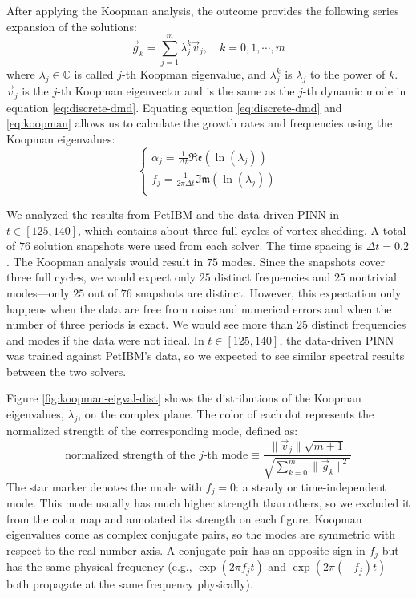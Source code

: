 After applying the Koopman analysis, the outcome provides the following series expansion of the solutions:
\begin{equation}\label{eq:koopman}
    \vec{g}_k
    =
    \sum\limits_{j=1}^{m}
    \lambda_j^k \vec{v}_j
    ,\quad
    k = 0, 1, \cdots, m
\end{equation}
where $\lambda_j \in \mathbb{C}$ is called $j$-th Koopman eigenvalue, and $\lambda_j^k$ is $\lambda_j$ to the power of $k$.
$\vec{v}_j$ is the $j$-th Koopman eigenvector and is the same as the $j$-th dynamic mode in equation \eqref{eq:discrete-dmd}.
Equating equation \eqref{eq:discrete-dmd} and \eqref{eq:koopman} allows us to calculate the growth rates and frequencies using the Koopman eigenvalues:
\begin{equation}
    \left\{
        \begin{array}{l}
            \alpha_j = \frac{1}{\Delta t} \mathfrak{Re}\left(\ln\left(\lambda_j\right)\right) \\
            f_j = \frac{1}{2\pi\Delta t} \mathfrak{Im}\left(\ln\left(\lambda_j\right)\right) \\
        \end{array}
    \right.
\end{equation} 

We analyzed the results from PetIBM and the data-driven PINN in $t\in[125, 140]$, which contains about three full cycles of vortex shedding.
A total of $76$ solution snapshots were used from each solver.
The time spacing is $\Delta t = 0.2$.
The Koopman analysis would result in $75$ modes.
Since the snapshots cover three full cycles, we would expect only $25$ distinct frequencies and $25$ nontrivial modes---only $25$ out of $76$ snapshots are distinct.
However, this expectation only happens when the data are free from noise and numerical errors and when the number of three periods is exact.
We would see more than $25$ distinct frequencies and modes if the data were not ideal.
In $t \in [125, 140]$, the data-driven PINN was trained against PetIBM's data, so we expected to see similar spectral results between the two solvers.

Figure \ref{fig:koopman-eigval-dist} shows the distributions of the Koopman eigenvalues, $\lambda_j$, on the complex plane.
The color of each dot represents the normalized strength of the corresponding mode, defined as:
\begin{equation}
    \text{normalized strength of the }j\text{-th mode}
    \equiv
    \frac{\lVert \vec{v}_j \rVert \sqrt{m+1}}{\sqrt{\sum\limits_{k=0}^{m}\lVert\vec{g}_k\rVert^2}}
\end{equation}
The star marker denotes the mode with $f_j=0$: a steady or time-independent mode.
This mode usually has much higher strength than others, so we excluded it from the color map and annotated its strength on each figure.
Koopman eigenvalues come as complex conjugate pairs, so the modes are symmetric with respect to the real-number axis. 
A conjugate pair has an opposite sign in $f_j$ but has the same physical frequency (e.g., $\exp(2\pi f_jt)$ and $\exp(2\pi (-f_j)t)$ both propagate at the same frequency physically).

